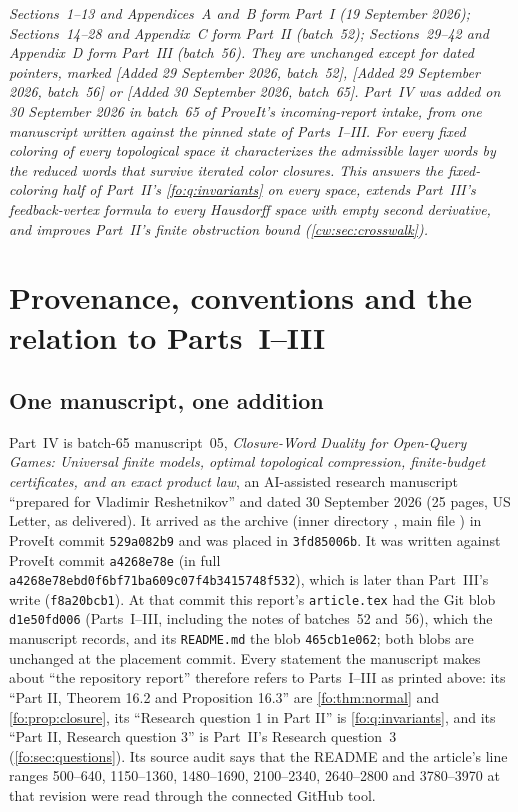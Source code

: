 \documentclass[11pt,letterpaper]{article}
\numberwithin{equation}{section}
\theoremstyle{definition}
\theoremstyle{remark}
\theoremstyle{definition}
\begin{document}
\noindent\emph{Sections~1--13 and Appendices~A and~B form Part~I (19 September
2026); Sections~14--28 and Appendix~C form Part~II (batch~52); Sections~29--42
and Appendix~D form Part~III (batch~56). They are unchanged except for dated
pointers, marked \textup{[Added 29 September 2026, batch~52]},
\textup{[Added 29 September 2026, batch~56]} or \textup{[Added 30 September
2026, batch~65]}. Part~IV was added on 30 September 2026 in batch~65 of
ProveIt's incoming-report intake, from one manuscript written against the
pinned state of Parts~I--III. For every fixed coloring of every topological
space it characterizes the admissible layer words by the reduced words that
survive iterated color closures. This answers the fixed-coloring half of
Part~II's \cref{fo:q:invariants} on every space, extends Part~III's
feedback-vertex formula to every Hausdorff space with empty second derivative,
and improves Part~II's finite obstruction bound (\cref{cw:sec:crosswalk}).}

\section{Provenance, conventions and the relation to Parts~I--III}
\label{cw:sec:provenance}

\subsection{One manuscript, one addition}
\label{cw:sec:source}
Part~IV is batch-65 manuscript~05, \emph{Closure-Word Duality for Open-Query
Games: Universal finite models, optimal topological compression, finite-budget
certificates, and an exact product law}, an AI-assisted research manuscript
``prepared for Vladimir Reshetnikov'' and dated 30 September 2026 (25 pages,
US Letter, as delivered). It arrived as the archive
 (inner directory
, main file ) in ProveIt
commit \texttt{529a082b9} and was placed in \texttt{3fd85006b}. It was written
against ProveIt commit \texttt{a4268e78e} (in full
\texttt{a4268e78ebd0f6bf71ba609c07f4b3415748f532}), which is later than
Part~III's write (\texttt{f8a20bcb1}). At that commit this report's
\texttt{article.tex} had the Git blob \texttt{d1e50fd006} (Parts~I--III,
including the notes of batches~52 and~56), which the manuscript records, and
its \texttt{README.md} the blob \texttt{465cb1e062}; both blobs are unchanged
at the placement commit. Every statement the manuscript makes about ``the
repository report'' therefore refers to Parts~I--III as printed above: its
``Part II, Theorem 16.2 and Proposition 16.3'' are \cref{fo:thm:normal} and
\cref{fo:prop:closure}, its ``Research question 1 in Part II'' is
\cref{fo:q:invariants}, and its ``Part II, Research question 3'' is Part~II's
Research question~3 (\cref{fo:sec:questions}). Its source audit says that the
README and the article's line ranges 500--640, 1150--1360, 1480--1690,
2100--2340, 2640--2800 and 3780--3970 at that revision were read through the
connected GitHub tool.
\end{document}
